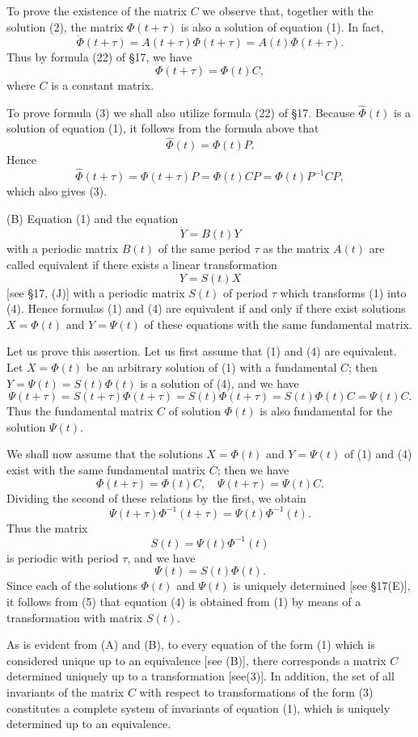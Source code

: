 \documentclass[10pt,a5paper]{book}
\theoremstyle{plain}
\theoremstyle{definition}
\theoremstyle{remark}
\begin{document}
To prove the existence of the matrix $C$ we observe that, together with the solution (2), the matrix $\Phi(t+\tau)$ is also a solution of equation (1). In fact,
\[
\dot{\Phi}(t+\tau)=A(t+\tau) \Phi(t+\tau)=A(t) \Phi(t+\tau) .
\]
Thus by formula (22) of §17, we have
\[
\Phi(t+\tau)=\Phi(t) C,
\]
where $C$ is a constant matrix.

To prove formula (3) we shall also utilize formula (22) of §17. Because $\hat{\Phi}(t)$ is a solution of equation (1), it follows from the formula above that
\[
\hat{\Phi}(t)=\Phi(t) P .
\]
Hence
\[
\hat{\Phi}(t+\tau)=\Phi(t+\tau) P=\Phi(t) C P=\hat{\Phi}(t) P^{-1} C P,
\]
which also gives (3).

(B) Equation (1) and the equation
\begin{equation*}
\dot{Y}=B(t) Y \tag{4}
\end{equation*}
with a periodic matrix $B(t)$ of the same period $\tau$ as the matrix $A(t)$ are called equivalent if there exists a linear transformation
\[
Y=S(t) X
\]
[see §17, (J)] with a periodic matrix $S(t)$ of period $\tau$ which transforms (1) into (4). Hence formulas (1) and (4) are equivalent if and only if there exist solutions $X=\Phi(t)$ and $Y=\Psi(t)$ of these equations with the same fundamental matrix.

Let us prove this assertion. Let us first assume that (1) and (4) are equivalent. Let $X=\Phi(t)$ be an arbitrary solution of (1) with a fundamental $C$; then $Y=\Psi(t)=S(t) \Phi(t)$ is a solution of (4), and we have
\[
\Psi(t+\tau)=S(t+\tau) \Phi(t+\tau)=S(t) \Phi(t+\tau)=S(t) \Phi(t) C=\Psi(t) C .
\]
Thus the fundamental matrix $C$ of solution $\Phi(t)$ is also fundamental for the solution $\Psi(t)$.

We shall now assume that the solutions $X=\Phi(t)$ and $Y=\Psi(t)$ of (1) and (4) exist with the same fundamental matrix $C$; then we have
\[
\Phi(t+\tau)=\Phi(t) C, \quad \Psi(t+\tau)=\Psi(t) C .
\]
Dividing the second of these relations by the first, we obtain
\[
\Psi(t+\tau) \Phi^{-1}(t+\tau)=\Psi(t) \Phi^{-1}(t) .
\]
Thus the matrix
\[
S(t)=\Psi(t) \Phi^{-1}(t)
\]
is periodic with period $\tau$, and we have
\begin{equation*}
\Psi(t)=S(t) \Phi(t) . \tag{5}
\end{equation*}
Since each of the solutions $\Phi(t)$ and $\Psi(t)$ is uniquely determined [see §17(E)], it follows from (5) that equation (4) is obtained from (1) by means of a transformation with matrix $S(t)$.

As is evident from (A) and (B), to every equation of the form (1) which is considered unique up to an equivalence [see (B)], there corresponds a matrix $C$ determined uniquely up to a transformation [see(3)]. In addition, the set of all invariants of the matrix $C$ with respect to transformations of the form (3) constitutes a complete system of invariants of equation (1), which is uniquely determined up to an equivalence.
\end{document}
